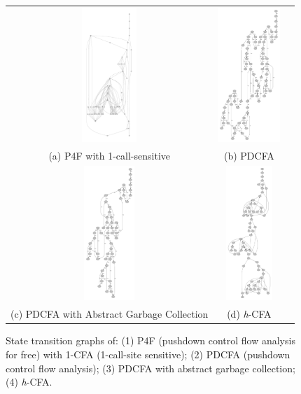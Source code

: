 \documentclass{article}
\begin{document}
\begin{figure}
\small
\begin{center}
\begin{tabular}{ccc}
\includegraphics[height=2in]{1p4f.pdf}
&
\includegraphics[height=2in]{pdcfaWOgc.pdf}
\\
(a) P4F with 1-call-sensitive
&
(b) PDCFA
\\
\includegraphics[height=2in]{pdcfa.pdf}
&
\includegraphics[height=2in]{hcfa.pdf}
\\
(c) PDCFA with Abstract Garbage Collection
&
(d) \textit{h}-CFA
\end{tabular}
\end{center}
\caption{
State transition graphs of: (1) P4F (pushdown control flow analysis for free) with 1-CFA (1-call-site sensitive);
(2) PDCFA (pushdown control flow analysis); (3) PDCFA with abstract garbage collection; (4) \textit{h}-CFA\@.
}
\label{fig:state-graphs}
\end{figure}
\end{document}
